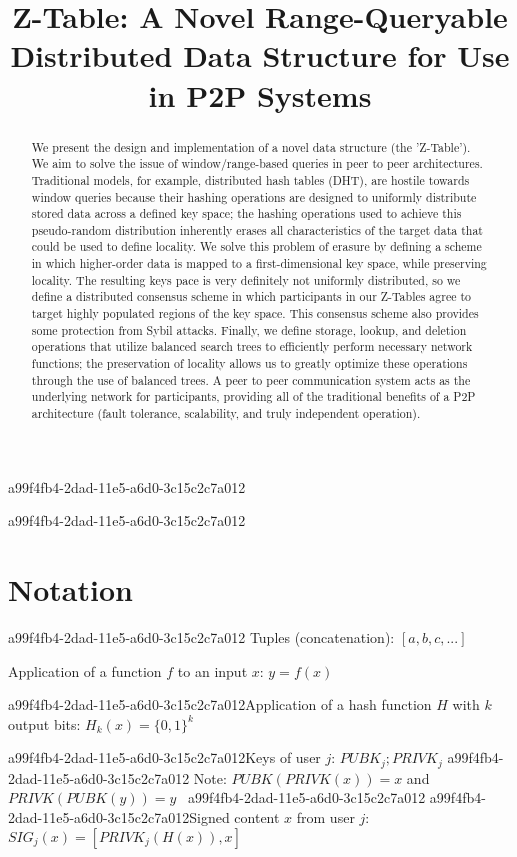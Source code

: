 \documentclass[12pt]{article}
\title{Z-Table: A Novel Range-Queryable Distributed Data Structure for Use in P2P Systems}
\begin{document}
\maketitle
a99f4fb4-2dad-11e5-a6d0-3c15c2c7a012
\begin{abstract}
We present the design and implementation of a novel data structure (the 'Z-Table'). We aim to solve the issue of window/range-based queries in peer to peer architectures. Traditional models, for example,  distributed hash tables (DHT), are hostile towards window queries because their hashing operations are designed to uniformly distribute stored data across a defined key space; the hashing operations used to achieve this pseudo-random distribution inherently erases all characteristics of the target data that could be used to define locality. We solve this problem of erasure by defining a scheme in which higher-order data is mapped to a first-dimensional key space, while preserving locality. The resulting keys pace is very definitely not uniformly distributed, so we define a distributed consensus scheme in which participants in our Z-Tables agree to target highly populated regions of the key space. This consensus scheme also provides some protection from Sybil attacks. Finally, we define storage, lookup, and deletion operations that utilize balanced search trees to efficiently perform necessary network functions; the preservation of locality allows us to greatly optimize these operations through the use of balanced trees. A peer to peer communication system acts as the underlying network for participants, providing all of the traditional benefits of a P2P architecture (fault tolerance, scalability, and truly independent operation).
\end{abstract}

a99f4fb4-2dad-11e5-a6d0-3c15c2c7a012\section{Notation}
a99f4fb4-2dad-11e5-a6d0-3c15c2c7a012
Tuples (concatenation): $[a,b,c,...]$

Application of a function $f$ to an input $x$: $y=f(x)$

a99f4fb4-2dad-11e5-a6d0-3c15c2c7a012Application of a hash function $H$ with $k$ output bits: $H_{k}(x) = \{0,1\}^k$

a99f4fb4-2dad-11e5-a6d0-3c15c2c7a012Keys of user $j$: $ PUBK_j; PRIVK_j $
a99f4fb4-2dad-11e5-a6d0-3c15c2c7a012
Note: $PUBK(PRIVK(x)) = x$ and $PRIVK(PUBK(y)) = y$~
a99f4fb4-2dad-11e5-a6d0-3c15c2c7a012
a99f4fb4-2dad-11e5-a6d0-3c15c2c7a012Signed content $x$ from user $j$: $SIG_j(x) = \left[ PRIVK_j( H(x) ), x \right]$
\end{document}
